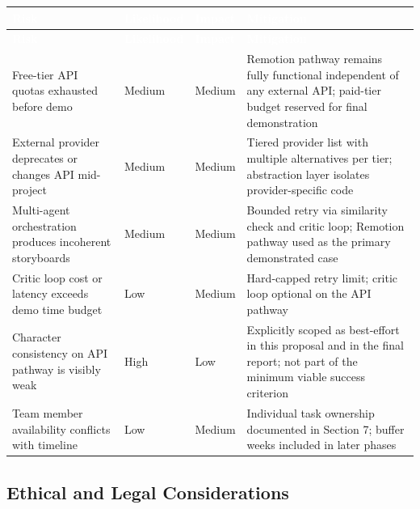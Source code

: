 \documentclass[11pt,a4paper]{article}
\newcommand{\tblhead}[1]{\cellcolor{headerblue}\textcolor{white}{\textbf{#1}}}
\begin{document}
\begin{center}
\begin{longtable}{|p{4cm}|p{1.7cm}|p{1.7cm}|p{6.6cm}|}
\hline
\tblhead{Risk} & \tblhead{Likelihood} & \tblhead{Impact} & \tblhead{Mitigation} \\
\hline
\endfirsthead
\hline
\tblhead{Risk} & \tblhead{Likelihood} & \tblhead{Impact} & \tblhead{Mitigation} \\
\hline
\endhead
Free-tier API quotas exhausted before demo & Medium & Medium & Remotion pathway remains fully functional independent of any external API; paid-tier budget reserved for final demonstration \\
\hline
External provider deprecates or changes API mid-project & Medium & Medium & Tiered provider list with multiple alternatives per tier; abstraction layer isolates provider-specific code \\
\hline
Multi-agent orchestration produces incoherent storyboards & Medium & Medium & Bounded retry via similarity check and critic loop; Remotion pathway used as the primary demonstrated case \\
\hline
Critic loop cost or latency exceeds demo time budget & Low & Medium & Hard-capped retry limit; critic loop optional on the API pathway \\
\hline
Character consistency on API pathway is visibly weak & High & Low & Explicitly scoped as best-effort in this proposal and in the final report; not part of the minimum viable success criterion \\
\hline
Team member availability conflicts with timeline & Low & Medium & Individual task ownership documented in Section 7; buffer weeks included in later phases \\
\hline
\end{longtable}
\end{center}

\subsection{Ethical and Legal Considerations}
\end{document}
